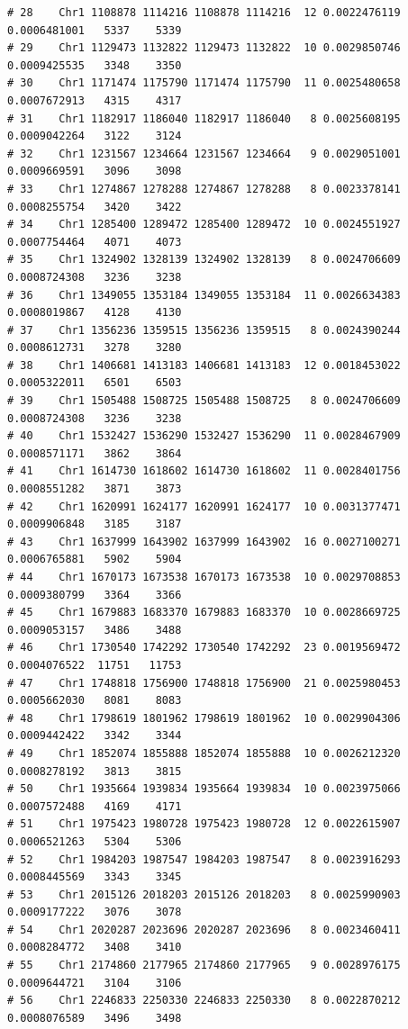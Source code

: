 \documentclass{article}\usepackage[]{graphicx}\usepackage[]{color}
\makeatletter
\newenvironment{kframe}{%
 \def\at@end@of@kframe{}%
 \ifinner\ifhmode%
  \def\at@end@of@kframe{\end{minipage}}%
  \begin{minipage}{\columnwidth}%
 \fi\fi%
 \def\FrameCommand##1{\hskip\@totalleftmargin \hskip-\fboxsep
 \colorbox{shadecolor}{##1}\hskip-\fboxsep
     \hskip-\linewidth \hskip-\@totalleftmargin \hskip\columnwidth}%
 \MakeFramed {\advance\hsize-\width
   \@totalleftmargin\z@ \linewidth\hsize
   \@setminipage}}%
 {\par\unskip\endMakeFramed%
 \at@end@of@kframe}
\newenvironment{knitrout}{}{} %
\makeatother
\begin{document}
\begin{knitrout}
\begin{kframe}
\begin{verbatim}
# 28    Chr1 1108878 1114216 1108878 1114216  12 0.0022476119 0.0006481001   5337    5339
# 29    Chr1 1129473 1132822 1129473 1132822  10 0.0029850746 0.0009425535   3348    3350
# 30    Chr1 1171474 1175790 1171474 1175790  11 0.0025480658 0.0007672913   4315    4317
# 31    Chr1 1182917 1186040 1182917 1186040   8 0.0025608195 0.0009042264   3122    3124
# 32    Chr1 1231567 1234664 1231567 1234664   9 0.0029051001 0.0009669591   3096    3098
# 33    Chr1 1274867 1278288 1274867 1278288   8 0.0023378141 0.0008255754   3420    3422
# 34    Chr1 1285400 1289472 1285400 1289472  10 0.0024551927 0.0007754464   4071    4073
# 35    Chr1 1324902 1328139 1324902 1328139   8 0.0024706609 0.0008724308   3236    3238
# 36    Chr1 1349055 1353184 1349055 1353184  11 0.0026634383 0.0008019867   4128    4130
# 37    Chr1 1356236 1359515 1356236 1359515   8 0.0024390244 0.0008612731   3278    3280
# 38    Chr1 1406681 1413183 1406681 1413183  12 0.0018453022 0.0005322011   6501    6503
# 39    Chr1 1505488 1508725 1505488 1508725   8 0.0024706609 0.0008724308   3236    3238
# 40    Chr1 1532427 1536290 1532427 1536290  11 0.0028467909 0.0008571171   3862    3864
# 41    Chr1 1614730 1618602 1614730 1618602  11 0.0028401756 0.0008551282   3871    3873
# 42    Chr1 1620991 1624177 1620991 1624177  10 0.0031377471 0.0009906848   3185    3187
# 43    Chr1 1637999 1643902 1637999 1643902  16 0.0027100271 0.0006765881   5902    5904
# 44    Chr1 1670173 1673538 1670173 1673538  10 0.0029708853 0.0009380799   3364    3366
# 45    Chr1 1679883 1683370 1679883 1683370  10 0.0028669725 0.0009053157   3486    3488
# 46    Chr1 1730540 1742292 1730540 1742292  23 0.0019569472 0.0004076522  11751   11753
# 47    Chr1 1748818 1756900 1748818 1756900  21 0.0025980453 0.0005662030   8081    8083
# 48    Chr1 1798619 1801962 1798619 1801962  10 0.0029904306 0.0009442422   3342    3344
# 49    Chr1 1852074 1855888 1852074 1855888  10 0.0026212320 0.0008278192   3813    3815
# 50    Chr1 1935664 1939834 1935664 1939834  10 0.0023975066 0.0007572488   4169    4171
# 51    Chr1 1975423 1980728 1975423 1980728  12 0.0022615907 0.0006521263   5304    5306
# 52    Chr1 1984203 1987547 1984203 1987547   8 0.0023916293 0.0008445569   3343    3345
# 53    Chr1 2015126 2018203 2015126 2018203   8 0.0025990903 0.0009177222   3076    3078
# 54    Chr1 2020287 2023696 2020287 2023696   8 0.0023460411 0.0008284772   3408    3410
# 55    Chr1 2174860 2177965 2174860 2177965   9 0.0028976175 0.0009644721   3104    3106
# 56    Chr1 2246833 2250330 2246833 2250330   8 0.0022870212 0.0008076589   3496    3498

\end{verbatim}
\end{kframe}
\end{knitrout}
\end{document}
